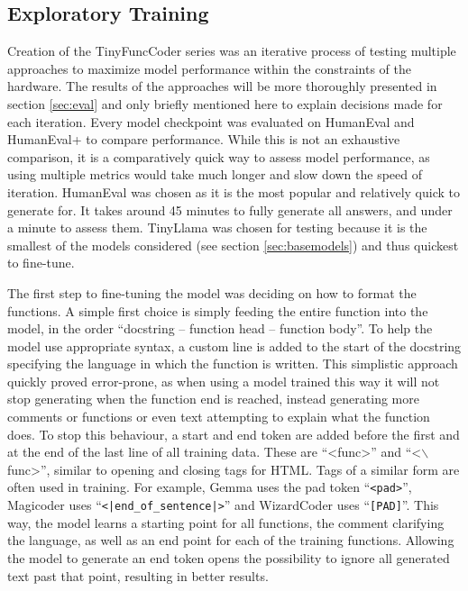 \subsection{Exploratory Training}
\label{sec:pretrain}

Creation of the TinyFuncCoder series was an iterative process of testing multiple approaches to maximize model performance within the constraints of the hardware.
The results of the approaches will be more thoroughly presented in section \ref{sec:eval} and only briefly mentioned here to explain decisions made for each iteration.
Every model checkpoint was evaluated on HumanEval and HumanEval+ to compare performance.
While this is not an exhaustive comparison, it is a comparatively quick way to assess model performance, as using multiple metrics would take much longer and slow down the speed of iteration.
HumanEval was chosen as it is the most popular and relatively quick to generate for. It takes around 45 minutes to fully generate all answers, and under a minute to assess them. TinyLlama was chosen for testing because it is the smallest of the models considered (see section \ref{sec:basemodels}) and thus quickest to fine-tune.

The first step to fine-tuning the model was deciding on how to format the functions.
A simple first choice is simply feeding the entire function into the model, in the order \enquote{docstring -- function head -- function body}.
To help the model use appropriate syntax, a custom line is added to the start of the docstring specifying the language in which the function is written.
This simplistic approach quickly proved error-prone, as when using a model trained this way it will not stop generating when the function end is reached, instead generating more comments or functions or even text attempting to explain what the function does.
To stop this behaviour, a start and end token are added before the first and at the end of the last line of all training data.
These are \enquote{<func>} and \enquote{<$\backslash$func>}, similar to opening and closing tags for HTML. 
Tags of a similar form are often used in training.
For example, Gemma uses the pad token \enquote{\texttt{<pad>}}, Magicoder uses \enquote{\texttt{<|end\_of\_sentence|>}} and WizardCoder uses \enquote{\texttt{[PAD]}}.
This way, the model learns a starting point for all functions, the comment clarifying the language, as well as an end point for each of the training functions.
Allowing the model to generate an end token opens the possibility to ignore all generated text past that point, resulting in better results.


